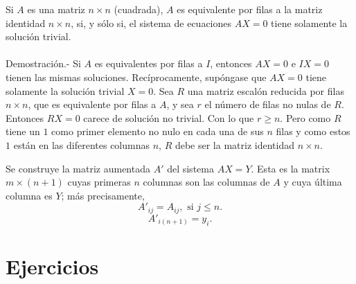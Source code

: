 \begin{teo}
    Si $A$ es una matriz $n\times n$ (cuadrada), $A$ es equivalente por filas a la matriz identidad $n\times n$, si, y sólo si, el sistema de ecuaciones $AX=0$ tiene solamente la solución trivial.\\\\
	Demostración.-\; Si $A$ es equivalentes por filas a $I$, entonces $AX=0$ e $IX=0$ tienen las mismas soluciones. Recíprocamente, supóngase que $AX=0$ tiene solamente la solución trivial $X=0$. Sea $R$ una matriz escalón reducida por filas $n\times n$, que es equivalente por filas a $A$, y sea $r$ el número de filas no nulas de $R$. Entonces $RX=0$ carece de solución no trivial. Con lo que $r\geq n.$ Pero como $R$ tiene un $1$ como primer elemento no nulo en cada una de sus $n$ filas y como estos $1$ están en las diferentes columnas $n$, $R$ debe ser la matriz identidad $n\times n$.
\end{teo}

Se construye la matriz aumentada $A'$ del sistema $AX=Y$. Esta es la matrix $m\times (n+1)$ cuyas primeras $n$ columnas son las columnas de $A$ y cuya última columna es $Y$; más precisamente,
$$A'_{ij}=A_{ij},\mbox{ si } j \leq n.$$
$$A'_{i(n+1)}=y_i.$$


\section{Ejercicios}


